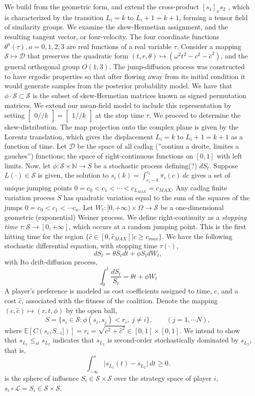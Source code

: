\documentclass[10pt]{article}
\newcommand{\mcL}{\mathcal{L}}
\newcommand{\mcS}{\mathcal{S}}
\newcommand{\mcD}{\mathcal{D}}
\theoremstyle{definition}
\begin{document}
We build from the geometric form, and
extend the cross-product $[s_1 ]_x s_2$ , which is characterized by the transition $L_i = k$ to $L_i+1 = k + 1$, forming a tensor field of similarity groups.
We examine the skew-Hermetian assignment, and the resulting tangent vector, or four-velocity. 
The four coordinate functions $\theta^a (\tau), a = 0, 1, 2, 3$ are real functions of a real variable $\tau$.
Consider a mapping $\mcS\mapsto \mcD$ that preserves the quadratic form $(t, r,
\theta)\mapsto (\omega^2 t^2-c^2-\hat c^2)$, and the general orthogonal group $O(1,3)$.
The jump-diffusion process was constructed to have ergodic properties so that
after flowing away from its initial condition it would generate
samples from the posterior probability model. We have that $\phi\cdot
\mcS\subset \mcS$ is the subset of skew-Hermetian matrices known as signed
permutation matrices. We extend our mean-field model to include this
representation by setting $\begin{bmatrix}0 // k\end{bmatrix} = \begin{bmatrix}1 //
k\end{bmatrix}$ at the stop time $\tau$.
We proceed to determine the skew-distribution. The map projection onto the complex plane is given by the Lorentz translation, which gives the displacement $L_i = k$ to $L_i+1 = k +1$ as a function of time.
Let $\mcD$ be the space of all cadlag (”continu a droite, limites a gauches”) functions; the space of
right-continuous functions on $[0, 1]$ with left limits.
Now, let $\phi:\mcS\times \mathbb{N} \rightarrow S$ be a stochastic process
defining(?) $dS_t$.
Suppose $L(\cdot)\in \mcS$ is given, the solution to
$s_i(k) = \int_{c_i - k}^{c_i} \pi_i(c) \ dc$ gives a set of unique jumping points $0=c_0<
c_1< \cdots < c_{L_{MAX}} = c_{MAX}$. 
Any cadlag finite variation process $S$ has quadratic variation equal to the sum
of the squares of the jumps $0=c_0<c_1<\cdots c_n$.
Let $W_t: [0, +\infty) \times \Omega \rightarrow \mcS$ be a
one-dimensional geometric (exponential) Weiner process. We define right-continuity as 
a \emph{stopping time} $\tau:\mcS \rightarrow [0,+\infty]$, which occurs at a random jumping point. This is the first hitting time
for the region $\lbrace \hat c \in [0,\hat c_{MAX}] \vert c \ge c_{max}\rbrace$.
We have the following stochastic differential equation, with stopping time
$\tau(\cdot)$,
$$
    dS_t = \theta S_t dt + \phi S_t dW_t,
$$
with Ito drift-diffusion process,
$$
    \displaystyle\int_0^t \frac{dS_t}{S_t} = \theta t + \phi W_t
$$
A player’s preference is modeled as cost coefficients assigned to time, $c$, and a cost $\hat c$, associated with the fitness of the coalition.
Denote the mapping $(c, \hat c) \mapsto (r, t, \phi)$ by the open ball,
$$
    S = \lbrace s_i \in \mcS : \phi(s_i, s_j) < r_i, \ j\ne i \rbrace, \qquad (j
    = 1, \cdots N),
$$
where $\mathbb{E}[C(s_i, S_{-i}])] = r_i = \sqrt{c^2 + \hat c^2} \in [0,1]\times
[0,1]$.
We intend to show that $s_{L_1} \le_{st} s_{L_2}$ indicates that $s_{L_1}$ is second-order stochastically dominated by $s_{L_2}$, that is, 
$$
    \displaystyle\int_{-\infty}^s\vert s_{L_1}(t) - s_{L_2} \vert \ dt \ge 0.
$$
is the sphere of influence $S_i \in \mcS\times\mcS$ over the strategy
space of player $i$, $s_i\circ\mcL = S_i \in \mcS\times\mcS$.
\end{document}
